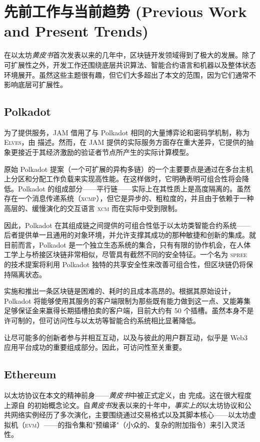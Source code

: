 \section{先前工作与当前趋势 (Previous Work and Present Trends)}\label{sec:previouswork}

在以太坊\emph{黄皮书}首次发表以来的几年中，区块链开发领域得到了极大的发展。除了可扩展性之外，开发工作还围绕底层共识算法、智能合约语言和机器以及整体状态环境展开。虽然这些主题很有趣，但它们大多超出了本文的范围，因为它们通常不影响底层可扩展性。

\subsection{Polkadot}

为了提供服务，JAM 借用了与 Polkadot 相同的大量博弈论和密码学机制，称为 \textsc{Elves}，由 \cite{cryptoeprint:2024/961} 描述。然而，在 JAM 提供的实际服务方面存在重大差异，它提供的抽象更接近于其经济激励的验证者节点所产生的实际计算模型。

原始 Polkadot 提案（一个可扩展的异构多链）的一个主要要点是通过在多台主机上分区和分配工作负载来实现高性能。在这样做时，它明确表明可组合性将会降低。Polkadot 的组成部分——平行链——实际上在其性质上是高度隔离的。虽然存在一个消息传递系统（\textsc{xcmp}），但它是异步的、粗粒度的，并且由于依赖于一种高层的、缓慢演化的交互语言 \textsc{xcm} 而在实际中受到限制。

因此，Polkadot 在其组成链之间提供的可组合性低于以太坊类智能合约系统——后者提供单一且通用的对象环境，并允许支撑其成功的那种敏捷和创新的集成。就目前而言，Polkadot 是一个独立生态系统的集合，只有有限的协作机会，在人体工学上与桥接区块链非常相似，尽管具有截然不同的安全特征。一个名为 \textsc{spree} 的技术提案将利用 Polkadot 独特的共享安全性来改善可组合性，但区块链仍将保持隔离状态。

实施和推出一条区块链是困难的、耗时的且成本高昂的。根据其原始设计，Polkadot 将能够使用其服务的客户端限制为那些既有能力做到这一点、又能筹集足够保证金来赢得长期插槽拍卖的客户端，目前大约有 50 个插槽。虽然本身不是许可制的，但可访问性与以太坊等智能合约系统相比显著降低。

让尽可能多的创新者参与并相互互动，以及与彼此的用户群互动，似乎是 Web3 应用平台成功的重要组成部分。因此，可访问性至关重要。

\subsection{Ethereum}

以太坊协议在本文的精神前身——\emph{黄皮书}中被正式定义，由 \cite{wood2014ethereum} 完成。这在很大程度上源自 \cite{buterin2013ethereum} 的初始概念论文。自\emph{黄皮书}发表以来的十年中，\emph{事实上的}以太坊协议和公共网络实例经历了多次演化，主要围绕通过交易格式以及其脚本核心——以太坊虚拟机（\textsc{evm}）——的指令集和"预编译"（小众的、复杂的附加指令）来引入灵活性。

